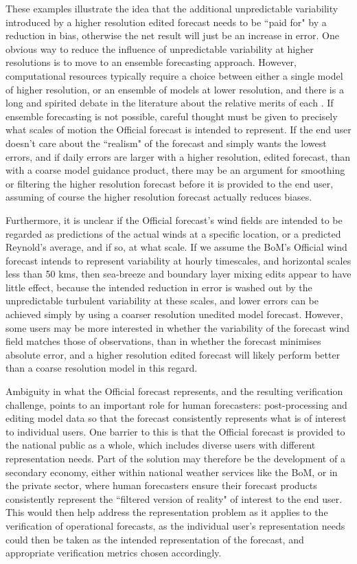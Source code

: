 \documentclass{ametsoc}
\begin{document}
These examples illustrate the idea that the additional unpredictable variability introduced by a higher resolution edited forecast needs to be ``paid for" by a reduction in bias, otherwise the net result will just be an increase in error.  One obvious way to reduce the influence of unpredictable variability at higher resolutions is to move to an ensemble forecasting approach. However, computational resources typically require a choice between either a single model of higher resolution, or an ensemble of models at lower resolution, and there is a long and spirited debate in the literature about the relative merits of each \citep{brooks93}. If ensemble forecasting is not possible, careful thought must be given to precisely what scales of motion the Official forecast is intended to represent. If the end user doesn't care about the ``realism" of the forecast and simply wants the lowest errors, and if daily errors are larger with a higher resolution, edited forecast, than with a coarse model guidance product, there may be an argument for smoothing or filtering the higher resolution forecast before it is provided to the end user, assuming of course the higher resolution forecast actually reduces biases. 

Furthermore, it is unclear if the Official forecast's wind fields are intended to be regarded as predictions of the actual winds at a specific location, or a predicted Reynold's average, and if so, at what scale. If we assume the BoM's Official wind forecast intends to represent variability at hourly timescales, and horizontal scales less than 50 kms, then sea-breeze and boundary layer mixing edits appear to have little effect, because the intended reduction in error is washed out by the unpredictable turbulent variability at these scales, and lower errors can be achieved simply by using a coarser resolution unedited model forecast. However, some users may be more interested in whether the variability of the forecast wind field matches those of observations, than in whether the forecast minimises absolute error, and a higher resolution edited forecast will likely perform better than a coarse resolution model in this regard. 

Ambiguity in what the Official forecast represents, and the resulting verification challenge, points to an important role for human forecasters: post-processing and editing model data so that the forecast consistently represents what is of interest to individual users. One barrier to this is that the Official forecast is provided to the national public as a whole, which includes diverse users with different representation needs. Part of the solution may therefore be the development of a secondary economy, either within national weather services like the BoM, or in the private sector, where human forecasters ensure their forecast products consistently represent the ``filtered version of reality" of interest to the end user. This would then help address the representation problem as it applies to the verification of operational forecasts, as the individual user's representation needs could then be taken as the intended representation of the forecast, and appropriate verification metrics chosen accordingly.    
\end{document}
